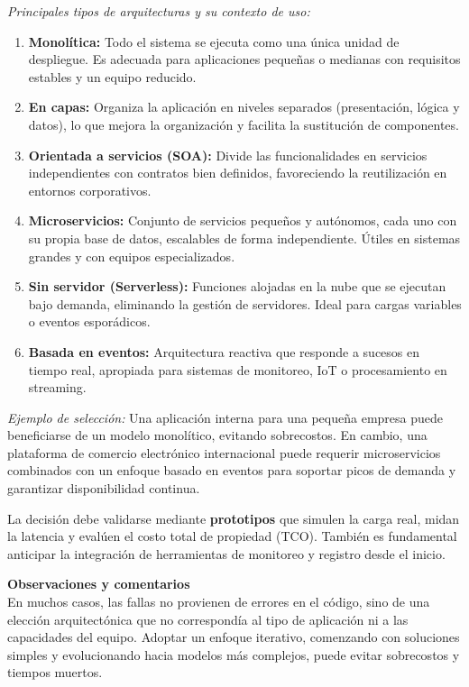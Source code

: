 \documentclass[12pt,letterpaper]{article}
\begin{document}
\textit{Principales tipos de arquitecturas y su contexto de uso:}
\begin{enumerate}
    \item \textbf{Monolítica:} Todo el sistema se ejecuta como una única unidad de despliegue. Es adecuada para aplicaciones pequeñas o medianas con requisitos estables y un equipo reducido.
    \item \textbf{En capas:} Organiza la aplicación en niveles separados (presentación, lógica y datos), lo que mejora la organización y facilita la sustitución de componentes.
    \item \textbf{Orientada a servicios (SOA):} Divide las funcionalidades en servicios independientes con contratos bien definidos, favoreciendo la reutilización en entornos corporativos.
    \item \textbf{Microservicios:} Conjunto de servicios pequeños y autónomos, cada uno con su propia base de datos, escalables de forma independiente. Útiles en sistemas grandes y con equipos especializados.
    \item \textbf{Sin servidor (Serverless):} Funciones alojadas en la nube que se ejecutan bajo demanda, eliminando la gestión de servidores. Ideal para cargas variables o eventos esporádicos.
    \item \textbf{Basada en eventos:} Arquitectura reactiva que responde a sucesos en tiempo real, apropiada para sistemas de monitoreo, IoT o procesamiento en streaming.
\end{enumerate}

\textit{Ejemplo de selección:}  
Una aplicación interna para una pequeña empresa puede beneficiarse de un modelo monolítico, evitando sobrecostos. En cambio, una plataforma de comercio electrónico internacional puede requerir microservicios combinados con un enfoque basado en eventos para soportar picos de demanda y garantizar disponibilidad continua.

La decisión debe validarse mediante \textbf{prototipos} que simulen la carga real, midan la latencia y evalúen el costo total de propiedad (TCO). También es fundamental anticipar la integración de herramientas de monitoreo y registro desde el inicio.

\textbf{Observaciones y comentarios}\\
En muchos casos, las fallas no provienen de errores en el código, sino de una elección arquitectónica que no correspondía al tipo de aplicación ni a las capacidades del equipo. Adoptar un enfoque iterativo, comenzando con soluciones simples y evolucionando hacia modelos más complejos, puede evitar sobrecostos y tiempos muertos.
\end{document}
